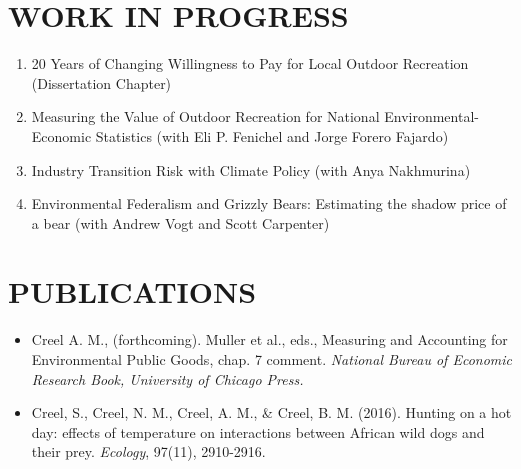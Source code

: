 \documentclass[11pt]{article}
\begin{document}
\section*{WORK IN PROGRESS}
\begin{enumerate}[left=0pt]
    \item 20 Years of Changing Willingness to Pay for Local Outdoor Recreation (Dissertation Chapter)
    \item Measuring the Value of Outdoor Recreation for National Environmental-Economic Statistics (with Eli P. Fenichel and Jorge Forero Fajardo)
    \item Industry Transition Risk with Climate Policy (with Anya Nakhmurina)
    \item Environmental Federalism and Grizzly Bears: Estimating the shadow price of a bear (with Andrew Vogt and Scott Carpenter)
\end{enumerate}

\section*{PUBLICATIONS}

\begin{itemize}[left=0pt, label={}, align=left, itemsep=0pt, parsep=0pt]
    \setlength{\itemindent}{-1em}
    \setlength{\leftskip}{1em}
    \setlength{\parindent}{-1em}
    \item Creel A. M., (forthcoming). Muller et al., eds., Measuring and Accounting for Environmental Public Goods, chap. 7 comment. \textit{National Bureau of Economic Research Book, University of Chicago Press.}
    \item Creel, S., Creel, N. M., Creel, A. M., \& Creel, B. M. (2016). Hunting on a hot day: effects of temperature on interactions between African wild dogs and their prey. \textit{Ecology}, 97(11), 2910-2916.
\end{itemize}

\clearpage
\end{document}

